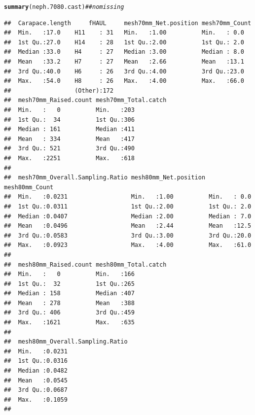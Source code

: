 \documentclass[12pt]{article}\usepackage[]{graphicx}\usepackage[]{color}
\makeatletter
\newcommand{\hlcom}[1]{\textcolor[rgb]{0.678,0.584,0.686}{\textit{#1}}}%
\newcommand{\hlstd}[1]{\textcolor[rgb]{0.345,0.345,0.345}{#1}}%
\newcommand{\hlkwd}[1]{\textcolor[rgb]{0.737,0.353,0.396}{\textbf{#1}}}%
\newenvironment{kframe}{%
 \def\at@end@of@kframe{}%
 \ifinner\ifhmode%
  \def\at@end@of@kframe{\end{minipage}}%
  \begin{minipage}{\columnwidth}%
 \fi\fi%
 \def\FrameCommand##1{\hskip\@totalleftmargin \hskip-\fboxsep
 \colorbox{shadecolor}{##1}\hskip-\fboxsep
     \hskip-\linewidth \hskip-\@totalleftmargin \hskip\columnwidth}%
 \MakeFramed {\advance\hsize-\width
   \@totalleftmargin\z@ \linewidth\hsize
   \@setminipage}}%
 {\par\unskip\endMakeFramed%
 \at@end@of@kframe}
\newenvironment{knitrout}{}{} %
\makeatother
\begin{document}
\begin{knitrout}
\begin{kframe}
\begin{alltt}
\hlkwd{summary}\hlstd{(neph.7080.cast)} \hlcom{## no missing}
\end{alltt}
\begin{verbatim}
##  Carapace.length     fHAUL     mesh70mm_Net.position mesh70mm_Count
##  Min.   :17.0    H11    : 31   Min.   :1.00          Min.   : 0.0  
##  1st Qu.:27.0    H14    : 28   1st Qu.:2.00          1st Qu.: 2.0  
##  Median :33.0    H4     : 27   Median :3.00          Median : 8.0  
##  Mean   :33.2    H7     : 27   Mean   :2.66          Mean   :13.1  
##  3rd Qu.:40.0    H6     : 26   3rd Qu.:4.00          3rd Qu.:23.0  
##  Max.   :54.0    H8     : 26   Max.   :4.00          Max.   :66.0  
##                  (Other):172                                       
##  mesh70mm_Raised.count mesh70mm_Total.catch
##  Min.   :   0          Min.   :203         
##  1st Qu.:  34          1st Qu.:306         
##  Median : 161          Median :411         
##  Mean   : 334          Mean   :417         
##  3rd Qu.: 521          3rd Qu.:490         
##  Max.   :2251          Max.   :618         
##                                            
##  mesh70mm_Overall.Sampling.Ratio mesh80mm_Net.position mesh80mm_Count
##  Min.   :0.0231                  Min.   :1.00          Min.   : 0.0  
##  1st Qu.:0.0311                  1st Qu.:2.00          1st Qu.: 2.0  
##  Median :0.0407                  Median :2.00          Median : 7.0  
##  Mean   :0.0496                  Mean   :2.44          Mean   :12.5  
##  3rd Qu.:0.0583                  3rd Qu.:3.00          3rd Qu.:20.0  
##  Max.   :0.0923                  Max.   :4.00          Max.   :61.0  
##                                                                      
##  mesh80mm_Raised.count mesh80mm_Total.catch
##  Min.   :   0          Min.   :166         
##  1st Qu.:  32          1st Qu.:265         
##  Median : 158          Median :407         
##  Mean   : 278          Mean   :388         
##  3rd Qu.: 406          3rd Qu.:459         
##  Max.   :1621          Max.   :635         
##                                            
##  mesh80mm_Overall.Sampling.Ratio
##  Min.   :0.0231                 
##  1st Qu.:0.0316                 
##  Median :0.0482                 
##  Mean   :0.0545                 
##  3rd Qu.:0.0687                 
##  Max.   :0.1059                 
## 
\end{verbatim}
\end{kframe}
\end{knitrout}
\end{document}
